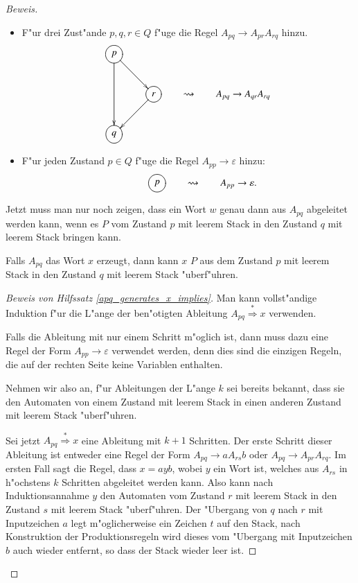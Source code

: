 \begin{proof}[Beweis]
\begin{itemize}
\item F"ur drei Zust"ande $p,q,r\in Q$ f"uge die Regel 
$A_{pq}\to A_{pr}A_{rq}$ hinzu.
\[
\begin{gathered}
\entrymodifiers={++[o][F]}
\xymatrix{
{p}\ar[dr]\ar[dd]
\\
*+\txt{}
	&{r}\ar[dl]
\\
{q}
}
\end{gathered}
\qquad\rightsquigarrow\qquad A_{pq}\to A_{qr}A_{rq}
\]
\item F"ur jeden Zustand $p\in Q$ f"uge die Regel $A_{pp}\to \varepsilon$
hinzu:
\[
\begin{gathered}
\entrymodifiers={++[o][F]}
\xymatrix{
*+\txt{}
	&{p}
}
\end{gathered}
\qquad\rightsquigarrow\qquad
A_{pp}\to\varepsilon.
\]
\end{itemize}
Jetzt muss man nur noch zeigen, dass ein Wort $w$ genau dann aus $A_{pq}$
abgeleitet werden kann, wenn es $P$ vom Zustand $p$ mit leerem Stack
in den Zustand $q$ mit leerem Stack bringen kann.

\begin{hilfssatz}\label{apq_generates_x_implies}
Falls $A_{pq}$ das Wort $x$ erzeugt, dann kann $x$ $P$ aus dem Zustand
$p$ mit leerem Stack in den Zustand $q$ mit leerem Stack "uberf"uhren.
\end{hilfssatz}

\begin{proof}[Beweis von Hilfssatz \ref{apq_generates_x_implies}]
Man kann vollst"andige Induktion f"ur die L"ange der be\-n"otigten 
Ableitung $A_{pq}\overset{*}{\Rightarrow} x$ verwenden.

Falls die Ableitung mit nur einem Schritt m"oglich ist, dann muss
dazu eine Regel der Form $A_{pp}\to\varepsilon$ verwendet werden,
denn dies sind die einzigen Regeln, die auf der rechten Seite
keine Variablen enthalten. 

Nehmen wir also an, f"ur Ableitungen der L"ange $k$ sei bereits
bekannt, dass sie den Automaten von einem Zustand mit leerem Stack
in einen anderen Zustand mit leerem Stack "uberf"uhren.

Sei jetzt $A_{pq}\overset{*}{\Rightarrow}x$ eine Ableitung mit $k+1$
Schritten. Der erste Schritt dieser Ableitung ist entweder eine
Regel der Form $A_{pq}\to aA_{rs}b$ oder $A_{pq}\to A_{pr}A_{rq}$.
Im ersten Fall sagt die Regel, dass $x=ayb$, wobei $y$ ein
Wort ist, welches aus $A_{rs}$ in h"ochstens $k$ Schritten abgeleitet
werden kann. Also kann nach Induktionsannahme $y$ den Automaten vom
Zustand $r$ mit leerem Stack in den Zustand $s$ mit leerem Stack
"uberf"uhren. Der "Ubergang von $q$ nach $r$ mit Inputzeichen $a$
legt m"oglicherweise ein Zeichen $t$ auf den Stack, nach Konstruktion
der Produktionsregeln wird dieses vom "Ubergang mit Inputzeichen $b$
auch wieder entfernt, so dass der Stack wieder leer ist.


\end{proof}
\end{proof}
